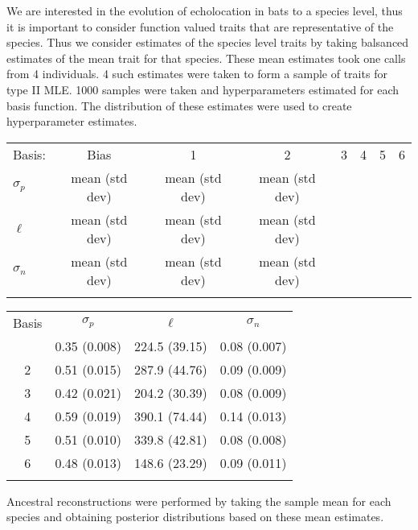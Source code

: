 \documentclass[wsdraft]{ws-rv9x6} %
\begin{document}
We are interested in the evolution of echolocation in bats to a species level, thus it is important to consider function valued traits that are representative of the species. Thus we consider estimates of the species level traits by taking balsanced estimates of the mean trait for that species. These mean estimates took one calls from 4 individuals. 4 such estimates were taken to form a sample of traits for type II MLE. 1000 samples were taken and hyperparameters estimated for each basis function. The distribution of these estimates were used to create hyperparameter estimates.

\begin{table}[ht]
	{
		\begin{tabular}{@{}lccccccc@{}} \toprule
			Basis: & Bias & 1 & 2 & 3 & 4 & 5 & 6 \\ 
			\colrule
			\(\sigma_p \)  & mean (std dev) & mean (std dev) & mean (std dev) &&&&  \\
			\(\ell\)  & mean (std dev) & mean (std dev) & mean (std dev) &&&& \\
			\(\sigma_n\)  & mean (std dev) & mean (std dev) & mean (std dev) &&&&  \\
			
			\botrule
		\end{tabular}
	}
	\label{tab::bat_results}
\end{table}

\begin{table}[ht]
	{
		\begin{tabular}{@{}cccc@{}} \toprule
			Basis & \(\sigma_p\) & \(\ell\) & \(\sigma_n\) \\
			\colrule
			1 & 0.35 (0.008) & 224.5 (39.15) & 0.08 (0.007) \\
			2 & 0.51 (0.015) & 287.9 (44.76) & 0.09 (0.009) \\
			3 & 0.42 (0.021)& 204.2 (30.39) & 0.08 (0.009) \\
			4 & 0.59 (0.019) & 390.1 (74.44) & 0.14 (0.013) \\
			5 & 0.51 (0.010) & 339.8 (42.81) & 0.08 (0.008) \\
			6 & 0.48 (0.013) & 148.6 (23.29) & 0.09 (0.011) \\
			\botrule
		\end{tabular}
	}
	\label{tab::bat_results_option2}
\end{table}

Ancestral reconstructions were performed by taking the sample mean for each species and obtaining posterior distributions based on these mean estimates.
\end{document}
